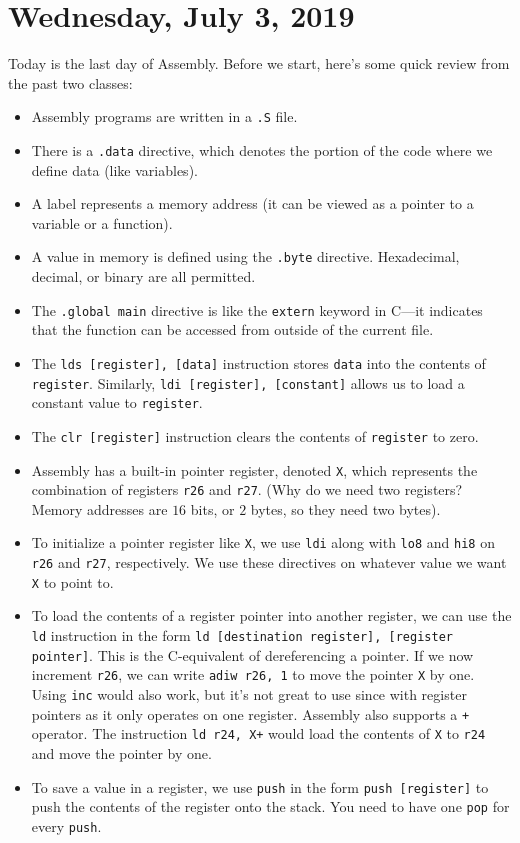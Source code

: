 \section{Wednesday, July 3, 2019}
Today is the last day of Assembly. Before we start, here's some quick review from the past two classes: \begin{itemize}
    \item Assembly programs are written in a \verb!.S! file.
    \item There is a \verb!.data! directive, which denotes the portion of the code where we define data (like variables).
    \item A label represents a memory address (it can be viewed as a pointer to a variable or a function). 
    \item A value in memory is defined using the \verb!.byte! directive. Hexadecimal, decimal, or binary are all permitted.
    \item The \verb!.global main! directive is like the \verb!extern! keyword in C---it indicates that the function can be accessed from outside of the current file.
    \item The \verb!lds [register], [data]! instruction stores \verb!data! into the contents of \verb!register!. Similarly, \verb!ldi [register], [constant]! allows us to load a constant value to \verb!register!. 
    \item The \verb!clr [register]! instruction clears the contents of \verb!register! to zero. 
    \item Assembly has a built-in pointer register, denoted \verb!X!, which represents the combination of registers \verb!r26! and \verb!r27!. (Why do we need two registers? Memory addresses are $16$ bits, or $2$ bytes, so they need two bytes).
    \item To initialize a pointer register like \verb!X!, we use \verb!ldi! along with \verb!lo8! and \verb!hi8! on \verb!r26! and \verb!r27!, respectively. We use these directives on whatever value we want \verb!X! to point to.
    \item To load the contents of a register pointer into another register, we can use the \verb!ld! instruction in the form \verb!ld [destination register], [register pointer]!. This is the C-equivalent of dereferencing a pointer. If we now increment \verb!r26!, we can write \verb!adiw r26, 1! to move the pointer \verb!X! by one. Using \verb!inc! would also work, but it's not great to use since with register pointers as it only operates on one register. Assembly also supports a \verb!+! operator. The instruction \verb!ld r24, X+! would load the contents of \verb!X! to \verb!r24! and move the pointer by one. 
    \item To save a value in a register, we use \verb!push! in the form \verb!push [register]! to push the contents of the register onto the stack. You need to have one \verb!pop! for every \verb!push!. 
\end{itemize}

